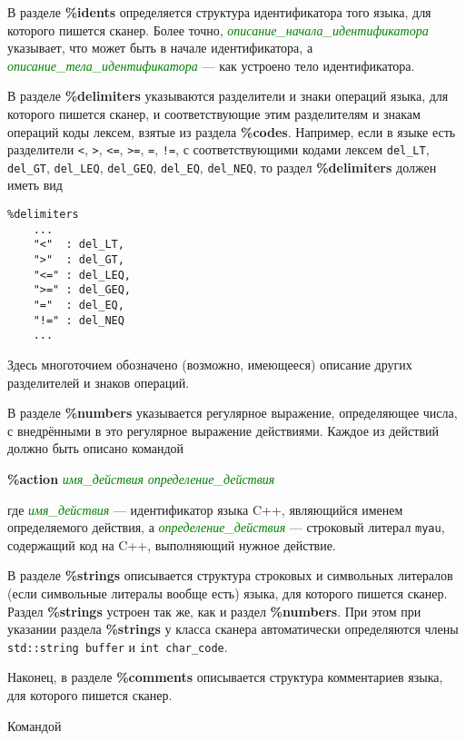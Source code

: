 \documentclass[10pt]{report}
\begin{document}
В разделе \textbf{\%idents} определяется структура идентификатора того языка, для которого пишется сканер. Более точно, 
\textcolor{Green}{\textit{описание_начала_идентификатора}} указывает, что может быть в начале идентификатора, а \textcolor{Green}{\textit{описание_тела_идентификатора}} --- как
устроено тело идентификатора.

В разделе \textbf{\%delimiters} указываются разделители и знаки операций языка, для которого пишется сканер, и соответствующие этим разделителям и знакам
операций коды лексем, взятые из раздела \textbf{\%codes}. Например, если в языке есть разделители \texttt{<}, \texttt{>}, \texttt{<=}, \texttt{>=}, \texttt{=}, \texttt{!=},
с соответствующими кодами лексем \texttt{del_LT}, \texttt{del_GT}, \texttt{del_LEQ}, \texttt{del_GEQ}, \texttt{del_EQ}, \texttt{del_NEQ}, то раздел \textbf{\%delimiters}
должен иметь вид
\begin{verbatim}
%delimiters
    ...
    "<"  : del_LT,
    ">"  : del_GT,
    "<=" : del_LEQ,
    ">=" : del_GEQ,
    "="  : del_EQ,
    "!=" : del_NEQ
    ...
\end{verbatim} 
Здесь многоточием обозначено (возможно, имеющееся) описание других разделителей и знаков операций.

В разделе \textbf{\%numbers} указывается регулярное выражение, определяющее числа, с внедрёнными в это регулярное выражение действиями. Каждое из действий должно
быть описано командой

{\noindent%
\textbf{\%action} \textcolor{Green}{\textit{имя_действия}} \textcolor{Green}{\textit{определение_действия}}
}

\noindent%
где \textcolor{Green}{\textit{имя_действия}} --- идентификатор языка C++, являющийся именем определяемого действия, а \textcolor{Green}{\textit{определение_действия}} ---
строковый литерал \texttt{myau}, содержащий код на C++, выполняющий нужное действие.

В разделе \textbf{\%strings} описывается структура строковых и символьных литералов (если символьные литералы вообще есть) языка, для которого пишется сканер.
Раздел \textbf{\%strings} устроен так же, как и раздел \textbf{\%numbers}. При этом при указании раздела
\textbf{\%strings} у класса сканера автоматически определяются члены \texttt{std::string buffer} и \texttt{int char_code}.

Наконец, в разделе \textbf{\%comments} описывается структура комментариев языка, для которого пишется сканер.

Командой 
\end{document}
